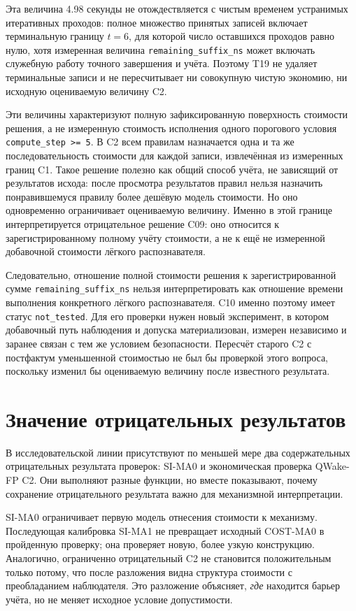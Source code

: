 Эта величина 4.98 секунды не отождествляется с чистым временем устранимых
итеративных проходов: полное множество принятых записей включает терминальную
границу $t=6$, для которой число оставшихся проходов равно нулю, хотя измеренная
величина \texttt{remaining\_suffix\_ns} может включать служебную работу точного
завершения и учёта. Поэтому T19 не удаляет терминальные записи и не пересчитывает
ни совокупную чистую экономию, ни исходную оцениваемую величину C2.

Эти величины характеризуют полную зафиксированную поверхность стоимости
решения, а не измеренную стоимость исполнения одного порогового условия
\texttt{compute\_step >= 5}. В C2 всем правилам назначается одна и та же
последовательность стоимости для каждой записи, извлечённая из измеренных
границ C1. Такое решение полезно как общий способ учёта, не зависящий от
результатов исхода: после просмотра результатов правил нельзя назначить
понравившемуся правилу более дешёвую модель стоимости. Но оно одновременно
ограничивает оцениваемую величину. Именно в этой границе интерпретируется
отрицательное решение C09: оно относится к зарегистрированному полному учёту
стоимости, а не к ещё не измеренной добавочной стоимости лёгкого распознавателя.

Следовательно, отношение полной стоимости решения к зарегистрированной сумме
\texttt{remaining\_suffix\_ns} нельзя интерпретировать как отношение времени
выполнения конкретного лёгкого распознавателя. C10 именно поэтому имеет статус
\texttt{not\_tested}. Для его проверки нужен новый эксперимент, в котором
добавочный путь наблюдения и допуска материализован, измерен независимо и
заранее связан с тем же условием безопасности. Пересчёт старого C2 с
постфактум уменьшенной стоимостью не был бы проверкой этого вопроса, поскольку
изменил бы оцениваемую величину после известного результата.

\section{Значение отрицательных результатов}
\label{sec:discussion-negative-results}

В исследовательской линии присутствуют по меньшей мере два содержательных
отрицательных результата проверок: SI-MA0 и экономическая проверка QWake-FP C2.
Они выполняют разные функции, но вместе показывают, почему сохранение
отрицательного результата важно для механизмной интерпретации.

SI-MA0 ограничивает первую модель отнесения стоимости к механизму. Последующая
калибровка SI-MA1 не превращает исходный COST-MA0 в пройденную проверку; она
проверяет новую, более узкую конструкцию. Аналогично, ограниченно отрицательный
C2 не становится положительным только потому, что после разложения видна
структура стоимости с преобладанием наблюдателя. Это разложение объясняет,
\emph{где} находится барьер учёта, но не меняет исходное условие допустимости.

